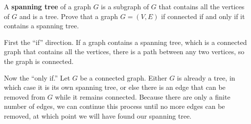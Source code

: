 \question A \textbf{spanning tree} of a graph $G$ is a subgraph of 
$G$ that contains all the vertices of $G$ and is a tree. \newline 
Prove that a graph $G = (V, E)$ if connected if and only if it contains 
a spanning tree.

\begin{solution}
First the “if” direction. If a graph contains a spanning tree, which 
is a connected graph that contains all the vertices, there is a path 
between any two vertices, so the graph is connected.\newline

Now the “only if.” Let $G$ be a connected graph. Either $G$ is already 
a tree, in which case it is its own spanning tree, or else there is an 
edge that can be removed from $G$ while it remains connected. Because 
there are only a finite number of edges, we can continue this process 
until no more edges can be removed, at which point we will have found our 
spanning tree.
\end{solution}

\clearpage

